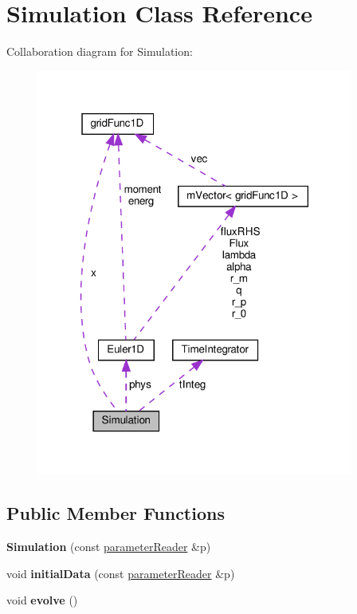 \hypertarget{classSimulation}{}\section{Simulation Class Reference}
\label{classSimulation}


Collaboration diagram for Simulation\+:
\nopagebreak
\begin{figure}[H]
\begin{center}
\leavevmode
\includegraphics[width=294pt]{classSimulation__coll__graph}
\end{center}
\end{figure}
\subsection*{Public Member Functions}
\begin{DoxyCompactItemize}
\item 
\mbox{\label{classSimulation_a895ff3188084f3b63238600cf9cd8659}} 
{\bfseries Simulation} (const \hyperlink{classparameterReader}{parameter\+Reader} \&p)
\item 
\mbox{\label{classSimulation_a2ee5c72ad5435c5defa6524e2aae45dd}} 
void {\bfseries initial\+Data} (const \hyperlink{classparameterReader}{parameter\+Reader} \&p)
\item 
\mbox{\label{classSimulation_a0892ba78c1bc7286488761b4fca76c52}} 
void {\bfseries evolve} ()
\end{DoxyCompactItemize}
